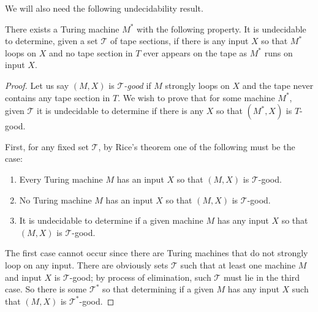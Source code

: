 \documentclass{article}
\newcommand{\Tc}{\mathcal{T}}
\begin{document}
We will also need the following undecidability result.
\begin{lemma}\label{lem:bespoke}
There exists a Turing machine $M^*$ with the following property. It is undecidable to determine, given a set $\Tc$ of tape sections, if there is any input $X$ so that $M^*$ loops on $X$ and no tape section in $T$ ever appears on the tape as $M^*$ runs on input $X$.
\end{lemma}
\begin{proof}
Let us say $(M, X)$ is \textit{$\Tc$-good} if $M$ strongly loops on $X$ and the tape never contains any tape section in $T$. We wish to prove that for some machine $M^*$, given $\Tc$ it is undecidable to determine if there is any $X$ so that $(M^*, X)$ is $T$-good.

First, for any fixed set $\Tc$, by Rice's theorem one of the following must be the case:
\begin{enumerate}
    \item Every Turing machine $M$ has an input $X$ so that $(M, X)$ is $\Tc$-good.
    \item No Turing machine $M$ has an input $X$ so that $(M, X)$ is $\Tc$-good.
    \item It is undecidable to determine if a given machine $M$ has any input $X$ so that $(M, X)$ is $\Tc$-good.
\end{enumerate}
The first case cannot occur since there are Turing machines that do not strongly loop on any input. There are obviously sets $\Tc$ such that at least one machine $M$ and input $X$ is $\Tc$-good; by process of elimination, such $\Tc$ must lie in the third case. So there is some $\Tc^*$ so that determining if a given $M$ has any input $X$ such that $(M, X)$ is $\Tc^*$-good.


\end{proof}
\end{document}
